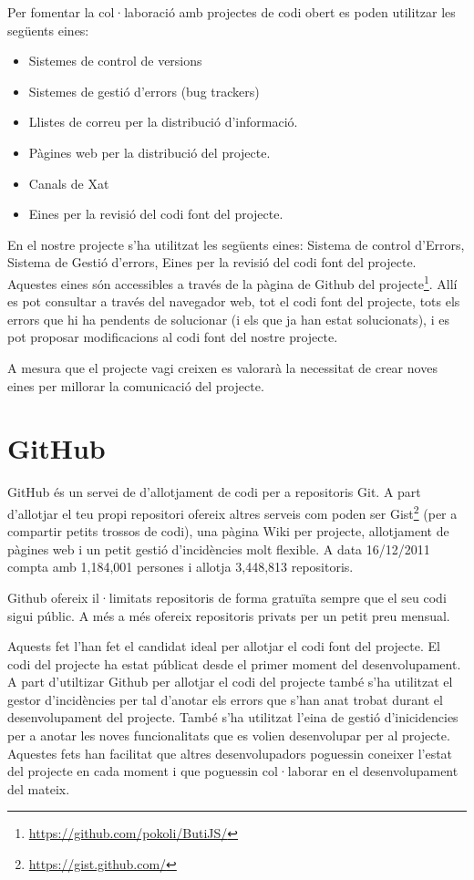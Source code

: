 Per fomentar la col·laboració amb projectes de codi obert es poden utilitzar les següents eines: 

\begin{itemize}
\item{Sistemes de control de versions}
\item{Sistemes de gestió d'errors (bug trackers)}
\item{Llistes de correu per la distribució d'informació.}
\item{Pàgines web per la distribució del projecte.}
\item{Canals de Xat}
\item{Eines per la revisió del codi font del projecte.}
\end{itemize}

En el nostre projecte s'ha utilitzat les següents eines: Sistema de control d'Errors, Sistema de Gestió d'errors, Eines per la revisió del codi font del projecte. Aquestes eines són accessibles a través de la pàgina de Github del projecte\footnote{\url{https://github.com/pokoli/ButiJS/}}. Allí es pot consultar a través del navegador web, tot el codi font del projecte, tots els errors que hi ha pendents de solucionar (i els que ja han estat solucionats), i es pot proposar modificacions al codi font del nostre projecte. 

A mesura que el projecte vagi creixen es valorarà la necessitat de crear noves eines per millorar la comunicació del projecte. 

\section{GitHub}

GitHub és un servei de d'allotjament de codi per a repositoris Git. A part d'allotjar el teu propi repositori ofereix altres serveis com poden ser Gist\footnote{\url{https://gist.github.com/}} (per a compartir petits trossos de codi), una pàgina Wiki per projecte, allotjament de pàgines web i un petit gestió d'incidències molt flexible. A data 16/12/2011 compta amb 1,184,001 persones i allotja 3,448,813 repositoris.

Github ofereix il·limitats repositoris de forma gratuïta sempre que el seu codi sigui públic. A més a més ofereix repositoris privats per un petit preu mensual. 

Aquests fet l'han fet el candidat ideal per allotjar el codi font del projecte. El codi del projecte ha estat públicat desde el primer moment del desenvolupament. A part d'utiltizar Github per allotjar el codi del projecte també s'ha utilitzat el gestor d'incidències per tal d'anotar els errors que s'han anat trobat durant el desenvolupament del projecte. També s'ha utilitzat l'eina de gestió d'inicidencies per a anotar les noves funcionalitats que es volien desenvolupar per al projecte. Aquestes fets han facilitat que altres desenvolupadors poguessin coneixer l'estat del projecte en cada moment i que poguessin col·laborar en el desenvolupament del mateix. 

